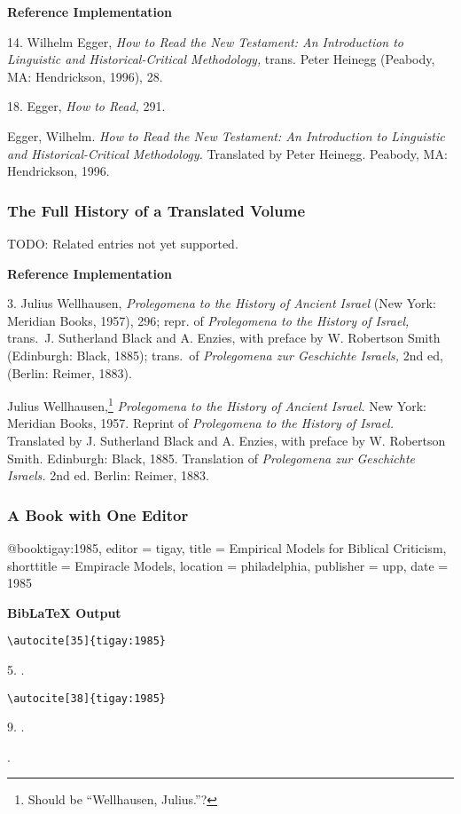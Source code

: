 \documentclass[a4paper]{article}
\newcommand\citetest[5]{%
  {\textbf{BibLaTeX Output}\par
   \nobreak
   \texttt{\textbackslash autocite[#2]\{#5\}}\par
   \color{biblatex-colour}
   #1. \cite[#2]{#5}.\par
   \color{black}
   \texttt{\textbackslash autocite[#4]\{#5\}}\par
   \color{biblatex-colour}
   #3. \cite[#4]{#5}.\par
   \hangindent\bibindent\bibentrycite{#5}.\par}}
\newenvironment{refimp}{%
  \begin{minipage}{\linewidth}
    \setlength{\parskip}{1ex}
    \textbf{Reference Implementation}\par
    \nobreak
    \color{reference-colour}
}{\end{minipage}}
\newenvironment{vb}{%
  \setlength{\parskip}{0pt}
  \verbatim}{\endverbatim}
\begin{document}
\begin{refimp}
  14. Wilhelm Egger, \emph{How to Read the New Testament: An Introduction to
  Linguistic and Historical-Critical Methodology,} trans. Peter Heinegg
  (Peabody, MA: Hendrickson, 1996), 28.

  18. Egger, \emph{How to Read,} 291.
  
  \hangindent\bibindent Egger, Wilhelm. \emph{How to Read the New Testament:
  An Introduction to Linguistic and Historical-Critical Methodology.}
  Translated by Peter Heinegg. Peabody, MA: Hendrickson, 1996.
\end{refimp}

\subsubsection{The Full History of a Translated Volume}

TODO: Related entries not yet supported.

\begin{refimp}
  3. Julius Wellhausen, \emph{Prolegomena to the History of Ancient Israel}
  (New York: Meridian Books, 1957), 296; repr. of \emph{Prolegomena to the
  History of Israel,} trans.\ J. Sutherland Black and A. Enzies, with preface
  by W. Robertson Smith (Edinburgh: Black, 1885); trans.\ of \emph{Prolegomena
  zur Geschichte Israels,} 2nd ed, (Berlin: Reimer, 1883).

  \hangindent\bibindent Julius Wellhausen,\footnote{Should be “Wellhausen,
  Julius.”?} \emph{Prolegomena to the History of Ancient Israel.} New York:
  Meridian Books, 1957. Reprint of \emph{Prolegomena to the History of
  Israel.} Translated by J. Sutherland Black and A. Enzies, with preface by W.
  Robertson Smith. Edinburgh: Black, 1885. Translation of \emph{Prolegomena
  zur Geschichte Israels.} 2nd ed. Berlin: Reimer, 1883.
\end{refimp}

\subsubsection{A Book with One Editor}

\begin{vb}
@book{tigay:1985,
  editor = tigay,
  title = {Empirical Models for Biblical Criticism},
  shorttitle = {Empiracle Models},
  location = philadelphia,
  publisher = upp,
  date = {1985}
}
\end{vb}  

\citetest{5}{35}{9}{38}{tigay:1985}
\end{document}
